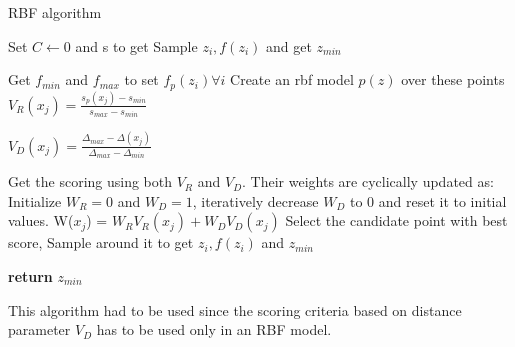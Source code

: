 \begin{algorithm}
\caption{RBF algorithm}\label{alg:rbf}
\begin{algorithmic}[1]
\State Set $C \gets 0$   
and s to get 
\State Sample $z_i, f(z_i)$ and get $z_{min}$

\State Get $f_{min}$ and $f_{max}$ to set $f_p(z_i) \forall i$
\State Create an rbf model $p(z)$ over these points
\State $V_R(x_j) = \displaystyle\frac{s_p(x_j)-s_{min}}{s_{max}-s_{min}}$

\State $V_D(x_j) = \displaystyle\frac{\Delta_{max}-\Delta(x_j)}{\Delta_{max}-\Delta_{min}}$

\Statex Get the scoring using both $V_R$ and $V_D$. Their weights are cyclically updated as: Initialize $W_R=0$ and $W_D=1$, iteratively decrease $W_D$ to 0 and reset it to initial values.
\State W($x_j$) = $W_RV_R(x_j) + W_DV_D(x_j) $
\State Select the candidate point with best score, 
\State Sample around it to get $z_i, f(z_i)$ and $z_{min}$

\EndWhile\label{RBFendwhile}
\State \textbf{return} $z_{min}$
\EndProcedure
\end{algorithmic}
\end{algorithm}

This algorithm had to be used since the scoring criteria based on distance parameter $V_D$ has to be used only in an RBF model.

